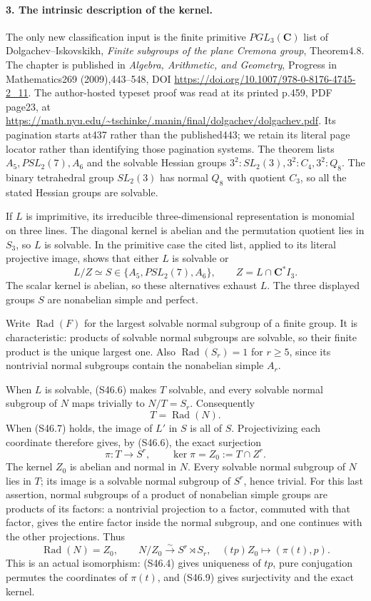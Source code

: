 \paragraph{3. The intrinsic description of the kernel.}
The only new classification input is the finite primitive
\(PGL_3(\mathbf C)\) list of Dolgachev--Iskovskikh,
\emph{Finite subgroups of the plane Cremona group}, Theorem4.8.
The chapter is published in \emph{Algebra, Arithmetic, and
Geometry}, Progress in Mathematics269 (2009),443--548,
DOI \url{https://doi.org/10.1007/978-0-8176-4745-2_11}.
The author-hosted typeset proof was read at its printed p.459,
PDF page23, at
\url{https://math.nyu.edu/~tschinke/.manin/final/dolgachev/dolgachev.pdf}.
Its pagination starts at437 rather than the published443; we
retain its literal page locator rather than identifying those
pagination systems. The theorem lists \(A_5,PSL_2(7),A_6\)
and the solvable Hessian groups
\(3^2:SL_2(3),3^2:C_4,3^2:Q_8\).
The binary tetrahedral group \(SL_2(3)\) has normal \(Q_8\)
with quotient \(C_3\), so all the stated Hessian groups are
solvable.

If \(L\) is imprimitive, its irreducible three-dimensional
representation is monomial on three lines. The diagonal kernel
is abelian and the permutation quotient lies in \(S_3\), so
\(L\) is solvable. In the primitive case the cited list, applied
to its literal projective image, shows that either \(L\) is
solvable or
\[
             L/Z\simeq S\in\{A_5,PSL_2(7),A_6\},
             \qquad Z=L\cap\mathbf C^*I_3.
 \tag{S46.7}
\]
The scalar kernel is abelian, so these alternatives exhaust \(L\).
The three displayed groups \(S\) are nonabelian simple and perfect.

Write \(\operatorname{Rad}(F)\) for the largest solvable normal
subgroup of a finite group. It is characteristic: products of
solvable normal subgroups are solvable, so their finite product
is the unique largest one. Also \(\operatorname{Rad}(S_r)=1\)
for \(r\ge5\), since its nontrivial normal subgroups contain
the nonabelian simple \(A_r\).

When \(L\) is solvable, (S46.6) makes \(T\) solvable,
and every solvable normal subgroup of \(N\) maps trivially
to \(N/T=S_r\). Consequently
\[
                         T=\operatorname{Rad}(N).
 \tag{S46.8}
\]
When (S46.7) holds, the image of \(L'\) in \(S\) is
all of \(S\). Projectivizing each coordinate therefore gives,
by (S46.6), the exact surjection
\[
 \pi:T\longrightarrow S^r,
       \qquad\ker\pi=Z_0:=T\cap Z^r.
 \tag{S46.9}
\]
The kernel \(Z_0\) is abelian and normal in \(N\). Every
solvable normal subgroup of \(N\) lies in \(T\); its image
is a solvable normal subgroup of \(S^r\), hence trivial.
For this last assertion, normal subgroups of a product of
nonabelian simple groups are products of its factors: a nontrivial
projection to a factor, commuted with that factor, gives the
entire factor inside the normal subgroup, and one continues
with the other projections. Thus
\[
 \operatorname{Rad}(N)=Z_0,\qquad
 N/Z_0\xrightarrow{\sim} S^r\rtimes S_r,
        \quad(tp)Z_0\longmapsto(\pi(t),p).
 \tag{S46.10}
\]
This is an actual isomorphism: (S46.4) gives uniqueness of
\(tp\), pure conjugation permutes the coordinates of \(\pi(t)\),
and (S46.9) gives surjectivity and the exact kernel.

